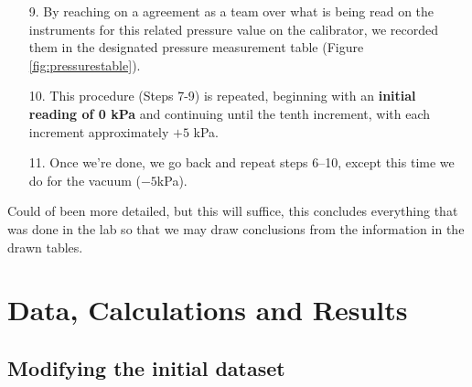 \documentclass{article}
\newcounter{dataset}
\begin{document}
	\begin{minipage}{0.51\textwidth}\vspace{-2em}\raggedright
		\begin{enumerate}[left=0in]
			\item[9.]  By reaching on a agreement as a team over what is being read on the instruments for this related pressure value on the calibrator, we recorded them in the designated pressure measurement table (Figure \ref{fig:pressurestable}). 
			\item[10.] This procedure (Steps 7-9) is repeated, beginning with an \textbf{initial reading of 0 kPa} and continuing until the tenth increment, with each increment approximately $+5$ kPa.
			\item[11.] Once we're done, we go back and repeat steps 6–10, except this time we do for the vacuum ($-5$kPa).
		\end{enumerate}\noindent
		Could of been more detailed, but this will suffice, this concludes everything that was done in the lab so that we may draw conclusions from the information in the drawn tables.
	\end{minipage}
	

	\newpage{}
	\section{Data, Calculations and Results}
	\tikzexternaldisable
	\subsection{Modifying the initial dataset}
\end{document}
